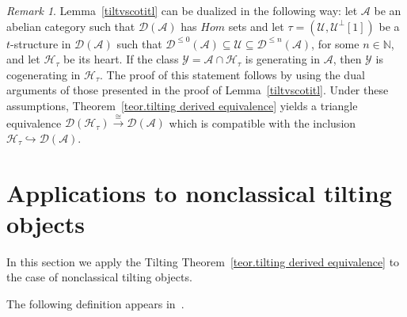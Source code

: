 \documentclass{proc-l}
\theoremstyle{definition}
\theoremstyle{remark}
\newtheorem{remark}[theorem]{Remark}
\numberwithin{equation}{section}
\begin{document}
\begin{remark}\label{dualtilt}
Lemma~\ref{tiltvscotitl} can be dualized in the following way: let $\mathcal{A}$ be an abelian category such that $\mathcal{D}(\mathcal{A})$ has $Hom$ sets and let $\tau =(\mathcal{U},\mathcal{U}^\perp [1])$  be a $t$-structure in $\mathcal{D}(\mathcal{A})$ such that $\mathcal{D}^{\leq 0}(\mathcal{A})\subseteq\mathcal{U}\subseteq\mathcal{D}^{\leq n}(\mathcal{A})$, for some $n\in\mathbb{N}$,  and let $\mathcal{H}_\tau$ be its heart. If  the class $\mathcal{Y}=\mathcal{A}\cap\mathcal{H}_\tau$ is generating in $\mathcal{A}$, then $\mathcal Y$ is cogenerating in $\mathcal{H}_\tau$. The proof of this statement follows by using the dual arguments of those presented in the proof of Lemma~\ref{tiltvscotitl}. Under these assumptions, Theorem~\ref{teor.tilting derived equivalence} yields a triangle equivalence 
$\mathcal{D}(\mathcal{H}_\tau )\stackrel{\cong}{\longrightarrow}\mathcal{D}(\mathcal{A})$ which is compatible with the inclusion 
$\mathcal{H}_\tau\hookrightarrow\mathcal{D}(\mathcal{A})$. 
\end{remark}




\section{Applications to nonclassical tilting objects}

In this section we apply the Tilting Theorem~\ref{teor.tilting derived equivalence} to the case of nonclassical tilting objects.

The following definition appears in~\cite{NSZM}. 
\end{document}
